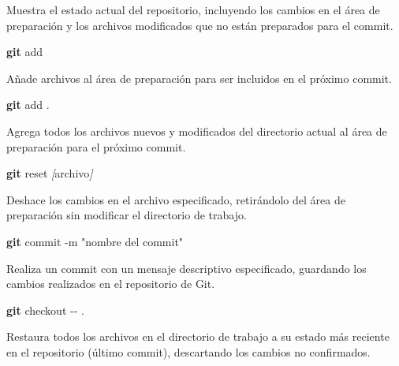 \documentclass[
]{book}
\newenvironment{Shaded}{\begin{snugshade}}{\end{snugshade}}
\newcommand{\AttributeTok}[1]{\textcolor[rgb]{0.13,0.29,0.53}{#1}}
\newcommand{\FunctionTok}[1]{\textcolor[rgb]{0.13,0.29,0.53}{\textbf{#1}}}
\newcommand{\NormalTok}[1]{#1}
\newcommand{\PreprocessorTok}[1]{\textcolor[rgb]{0.56,0.35,0.01}{\textit{#1}}}
\newcommand{\SpecialStringTok}[1]{\textcolor[rgb]{0.31,0.60,0.02}{#1}}
\newcommand{\StringTok}[1]{\textcolor[rgb]{0.31,0.60,0.02}{#1}}
\begin{document}
Muestra el estado actual del repositorio, incluyendo los cambios en el área de preparación y los archivos modificados que no están preparados para el commit.

\begin{Shaded}
\begin{Highlighting}[]
\FunctionTok{git}\NormalTok{ add}
\end{Highlighting}
\end{Shaded}

Añade archivos al área de preparación para ser incluidos en el próximo commit.

\begin{Shaded}
\begin{Highlighting}[]
\FunctionTok{git}\NormalTok{ add .}
\end{Highlighting}
\end{Shaded}

Agrega todos los archivos nuevos y modificados del directorio actual al área de preparación para el próximo commit.

\begin{Shaded}
\begin{Highlighting}[]
\FunctionTok{git}\NormalTok{ reset }\PreprocessorTok{[}\SpecialStringTok{archivo}\PreprocessorTok{]}
\end{Highlighting}
\end{Shaded}

Deshace los cambios en el archivo especificado, retirándolo del área de preparación sin modificar el directorio de trabajo.

\begin{Shaded}
\begin{Highlighting}[]
\FunctionTok{git}\NormalTok{ commit }\AttributeTok{{-}m} \StringTok{"nombre del commit"}
\end{Highlighting}
\end{Shaded}

Realiza un commit con un mensaje descriptivo especificado, guardando los cambios realizados en el repositorio de Git.

\begin{Shaded}
\begin{Highlighting}[]
\FunctionTok{git}\NormalTok{ checkout }\AttributeTok{{-}{-}}\NormalTok{ .}
\end{Highlighting}
\end{Shaded}

Restaura todos los archivos en el directorio de trabajo a su estado más reciente en el repositorio (último commit), descartando los cambios no confirmados.
\end{document}
